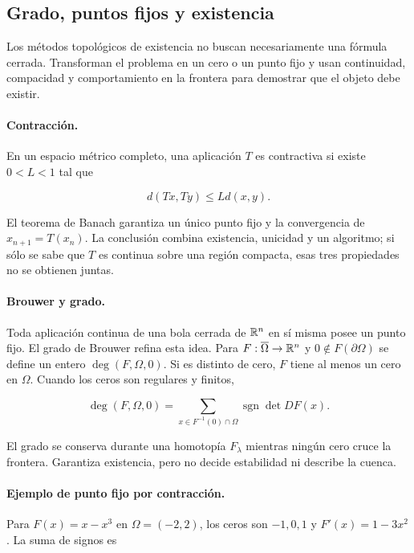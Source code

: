 \subsection{Grado, puntos fijos y existencia}

Los métodos topológicos de existencia no buscan necesariamente una fórmula cerrada.
Transforman el problema en un cero o un punto fijo y usan continuidad, compacidad y
comportamiento en la frontera para demostrar que el objeto debe existir.

\paragraph{Contracción.}
En un espacio métrico completo, una aplicación $T$ es contractiva si existe
$0<L<1$ tal que

\begin{equation}
 d(Tx,Ty)\leq Ld(x,y).
 \label{eq:gt-contraccion}
\end{equation}

El teorema de Banach garantiza un único punto fijo y la convergencia de
$x_{n+1}=T(x_n)$. La conclusión combina existencia, unicidad y un algoritmo; si sólo
se sabe que $T$ es continua sobre una región compacta, esas tres propiedades no se
obtienen juntas.

\paragraph{Brouwer y grado.}
Toda aplicación continua de una bola cerrada de $\mathbb{R}^n$ en sí misma posee un punto
fijo. El grado de Brouwer refina esta idea. Para
$F:\overline\Omega\to\mathbb{R}^n$ y $0\notin F(\partial\Omega)$ se define un entero
$\deg(F,\Omega,0)$. Si es distinto de cero, $F$ tiene al menos un cero en
$\Omega$. Cuando los ceros son regulares y finitos,

\begin{equation}
 \deg(F,\Omega,0)=
 \sum_{x\in F^{-1}(0)\cap\Omega}
 \operatorname{sgn}\det DF(x).
 \label{eq:gt-grado-regular}
\end{equation}

El grado se conserva durante una homotopía $F_\lambda$ mientras ningún cero cruce la
frontera. Garantiza existencia, pero no decide estabilidad ni describe la cuenca.

\paragraph{Ejemplo de punto fijo por contracción.}
Para $F(x)=x-x^3$ en $\Omega=(-2,2)$, los ceros son $-1,0,1$ y
$F'(x)=1-3x^2$. La suma de signos es

